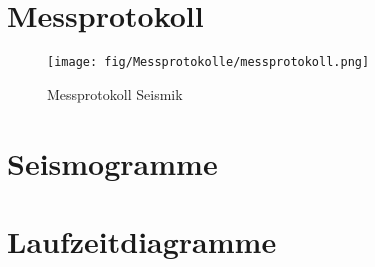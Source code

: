 \section{Messprotokoll}

\begin{figure}[h!]
 \centering
 \texttt{[image: fig/Messprotokolle/messprotokoll.png]}
 \caption{Messprotokoll Seismik}
 \label{fig:messprotokoll}
\end{figure}

\section{Seismogramme}

\section{Laufzeitdiagramme}

